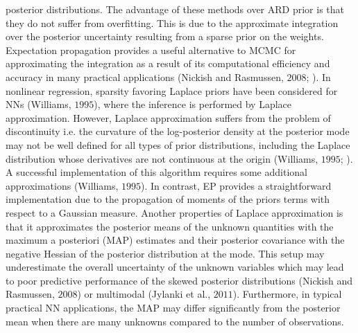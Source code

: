 \documentclass[]{article}
\begin{document}
posterior distributions. The advantage of these methods over ARD prior is that they do not suffer from overfitting. This is due to the approximate integration over the posterior uncertainty resulting from a sparse prior on the weights. Expectation propagation provides a useful alternative to MCMC for approximating the integration as a result of its computational efficiency and accuracy in many practical applications (Nickish and Rasmussen, $2008$; \cite{jose2010}). In nonlinear regression, sparsity favoring Laplace priors have been considered for NNs (Williams, $1995$), where the inference is performed by Laplace approximation. However, Laplace approximation suffers from the problem of discontinuity i.e. the curvature of the log-posterior density at the posterior mode may not be well defined for all types of prior distributions, including the Laplace distribution whose derivatives are not continuous at the origin (Williams, $1995$; \cite{seeger2008pro}). A successful implementation of this algorithm requires some additional approximations (Williams, $1995$). In contrast, EP provides a straightforward implementation due to the propagation of moments of the priors terms with respect to a Gaussian measure. Another properties of Laplace approximation is that it approximates the posterior means of the unknown quantities with the maximum a posteriori (MAP) estimates and their posterior covariance with the negative Hessian of the posterior distribution at the mode. This setup may underestimate the overall uncertainty of the unknown variables which may lead to poor predictive performance of the skewed posterior distributions (Nickish and Rasmussen, $2008$) or multimodal (Jylanki et al., $2011$). Furthermore, in typical practical NN applications, the MAP may differ significantly from the posterior mean when there are many unknowns compared to the number of observations. 
\end{document}
